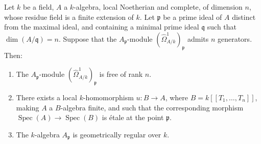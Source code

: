 \begin{corollary}[18.11.9]
\label{IV.18.11.9}
Let $k$ be a field, $A$ a $k$-algebra, local Noetherian and complete, of dimension $n$, whose residue field is a finite extension of $k$.
Let $\mathfrak{p}$ be a prime ideal of $A$ distinct from the maximal ideal, and containing a minimal prime ideal $\mathfrak{q}$ such that $\dim(A/\mathfrak{q})=n$.
Suppose that the $A_\mathfrak{p}$-module $(\hat{\Omega}^1_{A/k})_\mathfrak{p}$ admits $n$ generators.
Then:
\begin{enumerate}[label=\textup{(\roman*)}]
  \item The $A_\mathfrak{p}$-module $(\hat{\Omega}^1_{A/k})_\mathfrak{p}$ is free of rank $n$.
  \item There exists a local $k$-homomorphism $u:B\to A$, where $B=k[[T_1,\ldots,T_n]]$, making $A$ a $B$-algebra finite, and such that the corresponding morphism $\operatorname{Spec}(A)\to\operatorname{Spec}(B)$ is \'etale at the point $\mathfrak{p}$.
  \item The $k$-algebra $A_\mathfrak{p}$ is geometrically regular over $k$.
\end{enumerate}
\end{corollary}

